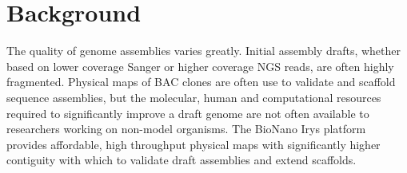 \documentclass{bmcart}
\begin{document}
\begin{frontmatter}
\begin{abstractbox}
\begin{keyword}
\end{keyword}


\end{abstractbox}
%

\end{frontmatter}



\section*{Background}
The quality of genome assemblies varies greatly. Initial assembly drafts, whether based on lower coverage Sanger or higher coverage NGS reads, are often highly fragmented. Physical maps of BAC clones are often use to validate and scaffold sequence assemblies, but the molecular, human and computational resources required to significantly improve a draft genome are not often available to researchers working on non-model organisms. The BioNano Irys platform provides affordable, high throughput physical maps with significantly higher contiguity with which to validate draft assemblies and extend scaffolds.
\end{document}
